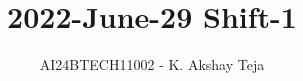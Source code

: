 \documentclass[journal,9pt,onecolumn]{IEEEtran}
\begin{document}

\vspace{3cm}

\title{2022-June-29 Shift-1}
\author{AI24BTECH11002 - K. Akshay Teja}
{\let\newpage\relax\maketitle}

\renewcommand{\thefigure}{\theenumi}
\renewcommand{\thetable}{\theenumi}
\setlength{\intextsep}{10pt} %

\renewcommand{\thetable}{\theenumi}
\end{document}

